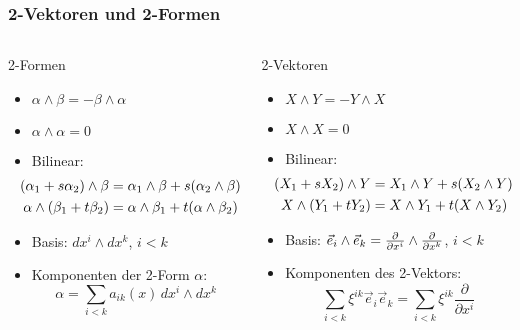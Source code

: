 %
%
%
\bgroup
\begin{frame}[t]
\setlength{\abovedisplayskip}{5pt}
\setlength{\belowdisplayskip}{5pt}
\frametitle{2-Vektoren und 2-Formen}
\vspace{-20pt}
\begin{columns}[t,onlytextwidth]
\begin{column}{0.48\textwidth}
\begin{block}{2-Formen}
\begin{itemize}
\item<3->
$\alpha\wedge \beta = - \beta\wedge \alpha$
\item<5->
$\alpha\wedge\alpha = 0$
\item<7->
Bilinear:
\[
\hspace*{-9pt}
\begin{aligned}
(\alpha_1+s\alpha_2)\wedge\beta
&=
\alpha_1\wedge\beta + s(\alpha_2\wedge\beta)
\\
\alpha\wedge(\beta_1+t\beta_2)
&=
\alpha\wedge\beta_1 + t(\alpha\wedge\beta_2)
\end{aligned}
\]
\item<9->
Basis: $dx^i\wedge dx^k$, $i<k$
\item<11->
Komponenten der 2-Form $\alpha$:
\[
\alpha
=
\sum_{i<k} a_{ik}(x)\,dx^i\wedge dx^k
\]
\end{itemize}
\end{block}
\end{column}
\begin{column}{0.48\textwidth}
\begin{block}{2-Vektoren}
\begin{itemize}
\item<2->
$X\wedge Y = - Y\wedge X$
\item<4->
$X\wedge X = 0$
\item<6->
Bilinear:
\[
\hspace*{-9pt}
\begin{aligned}
(X_1+sX_2)\wedge Y
&=
X_1\wedge Y + s(X_2\wedge Y)
\\
X\wedge(Y_1+tY_2)
&=
X\wedge Y_1 + t(X\wedge Y_2)
\end{aligned}
\]
\item<8->
Basis:
$
\vec{e}_i\wedge\vec{e}_k
=
\smash{\frac{\partial}{\partial x^i}\wedge\frac{\partial}{\partial x^k}}
$, $i<k$
\item<10->
Komponenten des 2-Vektors:
\[
\sum_{i<k} \xi^{ik} \vec{e}_i\vec{e}_k
=
\sum_{i<k} \xi^{ik}
\frac{\partial}{\partial x^i}
\]
\end{itemize}
\end{block}
\end{column}
\end{columns}
\end{frame}
